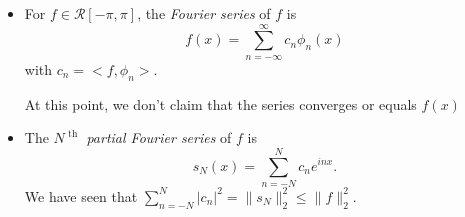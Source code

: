 \begin{define}
	\hfill
	\begin{itemize}
		\item
		      For $f \in \mathscr{R}[-\pi,\pi]$, the \textit{Fourier series} of $f$ is
		      \[
			      f(x)=\sum_{n=-\infty}^{\infty}{c_n \phi_n(x)}
		      \] with $c_n= <f, \phi_n>$.
		      \begin{remark}
			      At this point, we don't claim that the series converges or equals $f(x)$
		      \end{remark}
		\item The \textit{$N^{\text{ th } }$ partial Fourier series} of  $f$ is \[
			      s_N(x)=\sum_{n=-N}^{N}{c_n e^{inx}}
			      .\]
		      We have seen that $\sum_{n=-N}^{N}{\left|c_{n}\right|^2}=\|s_N\|_{2}^2\le \|f\|_{2}^2$.
	\end{itemize}
\end{define}
